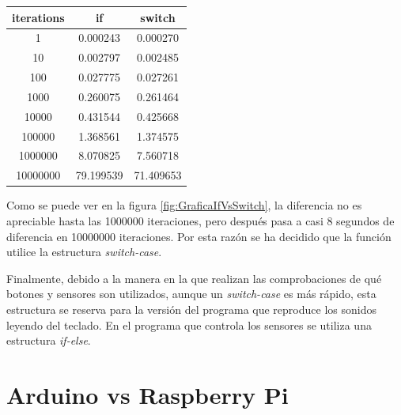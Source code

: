             \begin{center}
                \begin{tabular}{ |c|c|c| }
                    \hline
                        iterations & if & switch \\
                        \hline\hline
                        1 & 0.000243 & 0.000270 \\
                        \hline
                        10 & 0.002797 & 0.002485 \\
                        \hline
                        100 & 0.027775 & 0.027261 \\
                        \hline
                        1000 & 0.260075 & 0.261464 \\
                        \hline
                        10000 & 0.431544 & 0.425668 \\
                        \hline
                        100000 & 1.368561 & 1.374575 \\
                        \hline
                        1000000 & 8.070825 & 7.560718 \\
                        \hline
                        10000000 & 79.199539 & 71.409653 \\
                    \hline
                \end{tabular}
            \end{center}

            Como se puede ver en la figura \ref{fig:GraficaIfVsSwitch}, la diferencia no es apreciable hasta las
            1000000 iteraciones, pero después pasa a casi 8 segundos de diferencia en 10000000 iteraciones. Por
            esta razón se ha decidido que la función utilice la estructura \textit{switch-case}.\newline

            Finalmente, debido a la manera en la que realizan las comprobaciones de qué botones y sensores son
            utilizados, aunque un \textit{switch-case} es más rápido, esta estructura se reserva para la versión del
            programa que reproduce los sonidos leyendo del teclado. En el programa que controla los sensores se
            utiliza una estructura \textit{if-else}.



    \section{Arduino vs Raspberry Pi} %
    \label{sec:ArduinoVsRaspberryPi}

